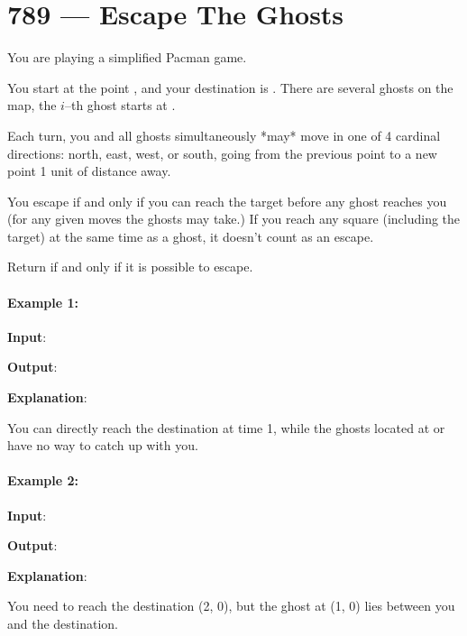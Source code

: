 \section{789 --- Escape The Ghosts}
You are playing a simplified Pacman game. 

You start at the point , and your destination is . There are several ghosts on the map, the $i$--th ghost starts at .

Each turn, you and all ghosts simultaneously *may* move in one of 4 cardinal directions: north, east, west, or south, going from the previous point to a new point 1 unit of distance away.

You escape if and only if you can reach the target before any ghost reaches you (for any given moves the ghosts may take.)  If you reach any square (including the target) at the same time as a ghost, it doesn't count as an escape.

Return  if and only if it is possible to escape.

\paragraph{Example 1:}

\begin{flushleft}
\textbf{Input}: 



\textbf{Output}: 

\textbf{Explanation}: 

You can directly reach the destination  at time 1, while the ghosts located at  or  have no way to catch up with you.

\end{flushleft}

\paragraph{Example 2:}

\begin{flushleft}

\textbf{Input}: 



\textbf{Output}: 

\textbf{Explanation}: 

You need to reach the destination (2, 0), but the ghost at (1, 0) lies between you and the destination.

\end{flushleft}


